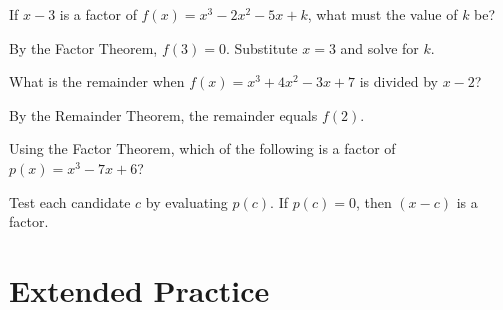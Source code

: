 \documentclass{ximera}
\begin{document}
\begin{problem}
If $x - 3$ is a factor of $f(x) = x^3 - 2x^2 - 5x + k$, what must the value of $k$ be?
\begin{hint}
By the Factor Theorem, $f(3) = 0$. Substitute $x=3$ and solve for $k$.
\end{hint}
\begin{multipleChoice}
\end{multipleChoice}
\end{problem}

\begin{problem}
What is the remainder when $f(x) = x^3 + 4x^2 - 3x + 7$ is divided by $x - 2$?
\begin{hint}
By the Remainder Theorem, the remainder equals $f(2)$.
\end{hint}
\begin{multipleChoice}
\end{multipleChoice}
\end{problem}

\begin{problem}
Using the Factor Theorem, which of the following is a factor of $p(x) = x^3 - 7x + 6$?
\begin{hint}
Test each candidate $c$ by evaluating $p(c)$. If $p(c)=0$, then $(x-c)$ is a factor.
\end{hint}
\begin{multipleChoice}
\end{multipleChoice}
\end{problem}


\bigskip
\section*{Extended Practice}
\end{document}
